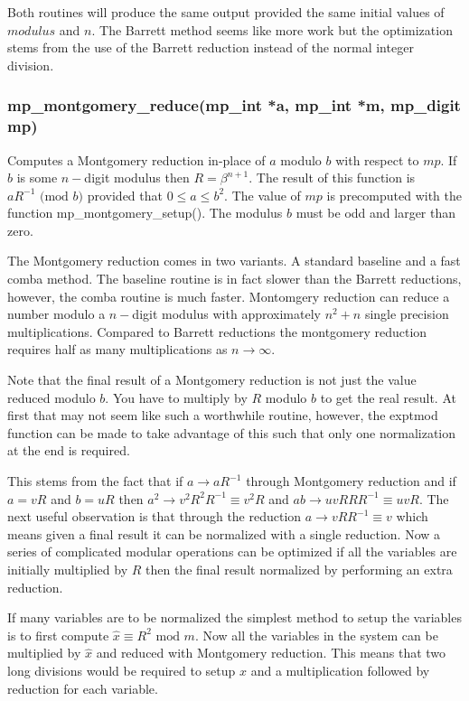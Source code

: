 \documentclass{article}
\begin{document}
Both routines will produce the same output provided the same initial values of $modulus$ and $n$.  The Barrett
method seems like more work but the optimization stems from the use of the Barrett reduction instead of the normal
integer division.

\subsubsection{mp\_montgomery\_reduce(mp\_int *a, mp\_int *m, mp\_digit mp)}
Computes a Montgomery reduction in-place of $a$ modulo $b$ with respect to $mp$.  If $b$ is some $n-$digit modulus then
$R = \beta^{n+1}$.  The result of this function is $aR^{-1} \mbox{ (mod }b\mbox{)}$ provided that $0 \le a \le b^2$.
The value of $mp$ is precomputed with the function mp\_montgomery\_setup().  The modulus $b$ must be odd and larger
than zero.  

The Montgomery reduction comes in two variants.  A standard baseline and a fast comba method.  The baseline routine
is in fact slower than the Barrett reductions, however, the comba routine is much faster.  Montomgery reduction can 
reduce a number modulo a $n-$digit modulus with approximately $n^2 + n$ single precision multiplications.  Compared
to Barrett reductions the montgomery reduction requires half as many multiplications as $n \rightarrow \infty$.  

Note that the final result of a Montgomery reduction is not just the value reduced modulo $b$.  You have to multiply
by $R$ modulo $b$ to get the real result.  At first that may not seem like such a worthwhile routine, however, the
exptmod function can be made to take advantage of this such that only one normalization at the end is required.

This stems from the fact that if $a \rightarrow aR^{-1}$ through Montgomery reduction and if $a = vR$ and $b = uR$ then
$a^2 \rightarrow v^2R^2R^{-1} \equiv v^2R$ and $ab \rightarrow uvRRR^{-1} \equiv uvR$.  The next useful observation is 
that through the reduction $a \rightarrow vRR^{-1} \equiv v$ which means given a final result it can be normalized with
a single reduction.  Now a series of complicated modular operations can be optimized if all the variables are initially
multiplied by $R$ then the final result normalized by performing an extra reduction.

If many variables are to be normalized the simplest method to setup the variables is to first compute $\hat x \equiv R^2 \mbox{ mod }m$.
Now all the variables in the system can be multiplied by $\hat x$ and reduced with Montgomery reduction.  This means that
two long divisions would be required to setup $\hat x$ and a multiplication followed by reduction for each variable.  
\end{document}
